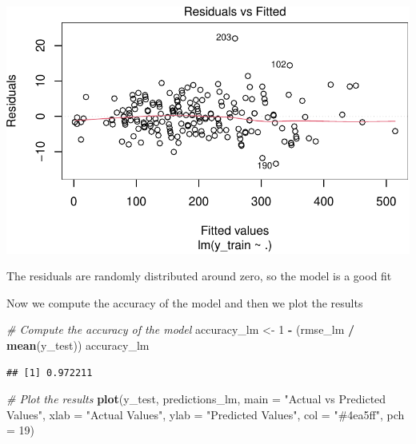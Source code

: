 \documentclass[
]{article}
\newenvironment{Shaded}{\begin{snugshade}}{\end{snugshade}}
\newcommand{\AttributeTok}[1]{\textcolor[rgb]{0.13,0.29,0.53}{#1}}
\newcommand{\CommentTok}[1]{\textcolor[rgb]{0.56,0.35,0.01}{\textit{#1}}}
\newcommand{\DecValTok}[1]{\textcolor[rgb]{0.00,0.00,0.81}{#1}}
\newcommand{\FunctionTok}[1]{\textcolor[rgb]{0.13,0.29,0.53}{\textbf{#1}}}
\newcommand{\NormalTok}[1]{#1}
\newcommand{\OtherTok}[1]{\textcolor[rgb]{0.56,0.35,0.01}{#1}}
\newcommand{\SpecialCharTok}[1]{\textcolor[rgb]{0.81,0.36,0.00}{\textbf{#1}}}
\newcommand{\StringTok}[1]{\textcolor[rgb]{0.31,0.60,0.02}{#1}}
\begin{document}
\begin{center}\includegraphics{Statistical_Learning_Final_Report_files/figure-latex/model_evaluation_lm-1} \end{center}

The residuals are randomly distributed around zero, so the model is a
good fit

Now we compute the accuracy of the model and then we plot the results

\begin{Shaded}
\begin{Highlighting}[]
\CommentTok{\# Compute the accuracy of the model}
\NormalTok{accuracy\_lm }\OtherTok{\textless{}{-}} \DecValTok{1} \SpecialCharTok{{-}}\NormalTok{ (rmse\_lm }\SpecialCharTok{/} \FunctionTok{mean}\NormalTok{(y\_test))}
\NormalTok{accuracy\_lm}
\end{Highlighting}
\end{Shaded}

\begin{verbatim}
## [1] 0.972211
\end{verbatim}

\begin{Shaded}
\begin{Highlighting}[]
\CommentTok{\# Plot the results}
\FunctionTok{plot}\NormalTok{(y\_test, predictions\_lm, }\AttributeTok{main =} \StringTok{"Actual vs Predicted Values"}\NormalTok{,}
     \AttributeTok{xlab =} \StringTok{"Actual Values"}\NormalTok{, }\AttributeTok{ylab =} \StringTok{"Predicted Values"}\NormalTok{,}
     \AttributeTok{col =} \StringTok{"\#4ea5ff"}\NormalTok{, }\AttributeTok{pch =} \DecValTok{19}\NormalTok{)}
\end{Highlighting}
\end{Shaded}
\end{document}
